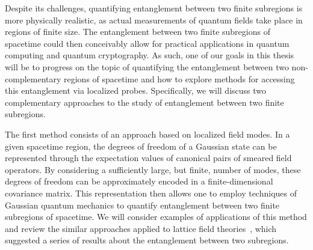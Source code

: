\documentclass[letterpaper,12pt,titlepage,oneside,final]{book}
\begin{document}

Despite its challenges, quantifying entanglement between two finite subregions is more physically realistic, as actual measurements of quantum fields take place in regions of finite size. The entanglement between two finite subregions of spacetime could then conceivably allow for practical applications in quantum computing and quantum cryptography. As such, one of our goals in this thesis will be to progress on the topic of quantifying the entanglement between two non-complementary regions of spacetime and how to explore methods for accessing this entanglement via localized probes. Specifically, we will discuss two complementary approaches to the study of entanglement between two finite subregions. 

The first method consists of an approach based on localized field modes. In a given spacetime region, the degrees of freedom of a Gaussian state can be represented through the expectation values of canonical pairs of smeared field operators. By considering a sufficiently large, but finite, number of modes, these degrees of freedom can be approximately encoded in a finite-dimensional covariance matrix. This representation then allows one to employ techniques of Gaussian quantum mechanics to quantify entanglement between two finite subregions of spacetime. We will consider examples of applications of this method and review the similar approaches applied to lattice field theories~\cite{KlcoUVIR,KlcoEntStrQFTI,KlcoEntStrQFTII,KlcoEntAllDist}, which suggested a series of results about the entanglement between two subregions.
\end{document}
